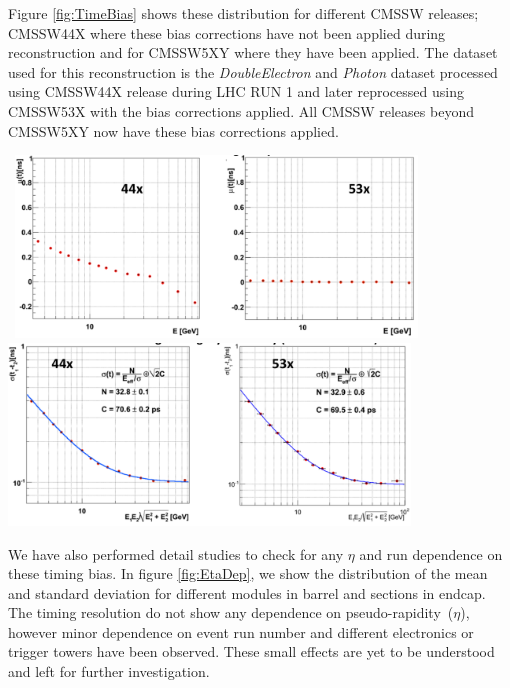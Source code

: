 Figure \ref{fig:TimeBias} shows these distribution for different CMSSW releases; CMSSW44X where these bias corrections have not been applied during reconstruction and for CMSSW5XY  where they have been applied. The dataset used for this reconstruction is the \textit{DoubleElectron} and \textit{Photon} dataset processed using CMSSW44X release during LHC RUN 1 and later reprocessed using CMSSW53X with the bias corrections applied. All CMSSW releases beyond CMSSW5XY now have these bias corrections applied. 

\begin{center}
\centering
\mbox{
\includegraphics[height=0.4\textwidth, width=0.8\textwidth]{THESISPLOTS/AmplitudeVsTimeCMSSW_Comparison.png} } 
\vspace{5cm}
\mbox{
\includegraphics[height=0.4\textwidth, width=0.8\textwidth]{THESISPLOTS/TimingResolutionCMSSW_Comparison.png}
}
\label{fig:TimeBias}
\end{center}
We have also performed detail studies to check for any $\eta$ and run dependence on these timing bias. In figure \ref{fig:EtaDep}, we show the distribution of the mean and standard deviation for different modules in barrel and sections in endcap. The timing resolution do not show any dependence on pseudo-rapidity~($\eta$), however minor dependence on event run number and different electronics or trigger towers have been observed. These small effects are yet to be understood and left for further investigation.

